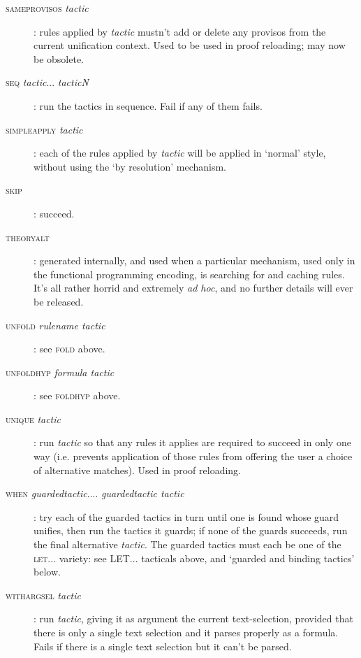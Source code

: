 \begin{description}
\item [\textsc{sameprovisos} \textit{tactic}]: rules applied by \textit{tactic} mustn't add or delete any provisos from the current unification context. Used to be used in proof reloading; may now be obsolete.


\item [\textsc{seq} \textit{tactic}... \textit{tacticN}]: run the tactics in sequence. Fail if any of them fails.


\item [\textsc{simpleapply} \textit{tactic}]: each of the rules applied by \textit{tactic} will be applied in `normal' style, without using the `by resolution' mechanism.


\item [\textsc{skip}]: succeed.


\item [\textsc{theoryalt}]: generated internally, and used when a particular mechanism, used only in the functional programming encoding, is searching for and caching rules. It's all rather horrid and extremely \textit{ad hoc}, and no further details will ever be released.


\item [\textsc{unfold} \textit{rulename tactic}]: see \textsc{fold} above.
\item [\textsc{unfoldhyp} \textit{formula tactic}]: see \textsc{foldhyp} above.


\item [\textsc{unique} \textit{tactic}]: run \textit{tactic} so that any rules it applies are required to succeed in only one way (i.e. prevents application of those rules from offering the user a choice of alternative matches). Used in proof reloading.


\item [\textsc{when} \textit{guardedtactic}.... \textit{guardedtactic tactic}]: try each of the guarded tactics in turn until one is found whose guard unifies, then run the tactics it guards; if none of the guards succeeds, run the final alternative \textit{tactic}. The guarded tactics must each be one of the \textsc{let...} variety: see \textsc{LET...} tacticals above, and `guarded and binding tactics' below.


\item [\textsc{withargsel} \textit{tactic}]: run \textit{tactic}, giving it as argument the current text-selection, provided that there is only a single text selection and it parses properly as a formula. Fails if there is a single text selection but it can't be parsed.



\end{description}
